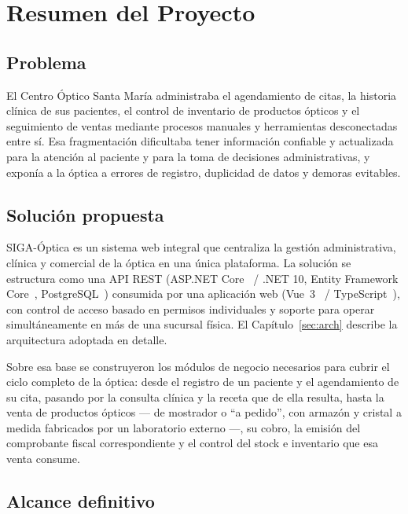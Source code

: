 \chapter{Resumen del Proyecto}
\label{sec:resumen-proyecto}

\section{Problema}
\label{sec:resumen-problema}

El Centro Óptico Santa María administraba el agendamiento de citas, la historia clínica de sus pacientes, el control de inventario de productos ópticos y el seguimiento de ventas mediante procesos manuales y herramientas desconectadas entre sí. Esa fragmentación dificultaba tener información confiable y actualizada para la atención al paciente y para la toma de decisiones administrativas, y exponía a la óptica a errores de registro, duplicidad de datos y demoras evitables.

\section{Solución propuesta}
\label{sec:resumen-solucion}

SIGA-Óptica es un sistema web integral que centraliza la gestión administrativa, clínica y comercial de la óptica en una única plataforma. La solución se estructura como una API REST (ASP.NET Core~\cite{msaspnetcore} / .NET 10, Entity Framework Core~\cite{msefcore}, PostgreSQL~\cite{postgresql}) consumida por una aplicación web (Vue~3~\cite{vuejs} / TypeScript~\cite{typescript}), con control de acceso basado en permisos individuales y soporte para operar simultáneamente en más de una sucursal física. El Capítulo~\ref{sec:arch} describe la arquitectura adoptada en detalle.

Sobre esa base se construyeron los módulos de negocio necesarios para cubrir el ciclo completo de la óptica: desde el registro de un paciente y el agendamiento de su cita, pasando por la consulta clínica y la receta que de ella resulta, hasta la venta de productos ópticos --- de mostrador o ``a pedido'', con armazón y cristal a medida fabricados por un laboratorio externo ---, su cobro, la emisión del comprobante fiscal correspondiente y el control del stock e inventario que esa venta consume.

\section{Alcance definitivo}
\label{sec:resumen-alcance}

